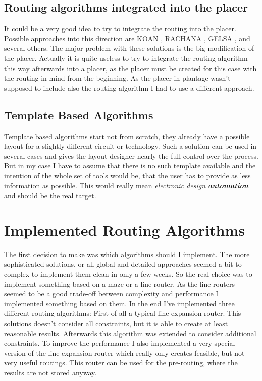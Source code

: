 \subsection{Routing algorithms integrated into the placer}
It could be a very good idea to try to integrate the routing into the placer. Possible approaches into this direction are KOAN \cite[page 178]{springer:eda_analog_routing}, RACHANA \cite[page 178]{springer:eda_analog_routing}, GELSA \cite[page 179]{springer:eda_analog_routing}, and several others. The major problem with these solutions is the big modification of the placer. Actually it is quite useless to try to integrate the routing algorithm this way afterwards into a placer, as the placer must be created for this case with the routing in mind from the beginning. As the placer in plantage wasn't supposed to include also the routing algorithm I had to use a different approach.

\subsection{Template Based Algorithms}
Template based algorithms start not from scratch, they already have a possible layout for a slightly different circuit or technology. Such a solution can be used in several cases and gives the layout designer nearly the full control over the process. But in my case I have to assume that there is no such template available and the intention of the whole set of tools would be, that the user has to provide as less information as possible. This would really mean \textit{electronic design \textbf{automation}} and should be the real target.

\section{Implemented Routing Algorithms}
The first decision to make was which algorithms should I implement. The more sophisticated solutions, or all global and detailed approaches seemed a bit to complex to implement them clean in only a few weeks. So the real choice was to implement something based on a maze or a line router. As the line routers seemed to be a good trade-off between complexity and performance I implemented something based on them. In the end I've implemented three different routing algorithms: First of all a typical line expansion router. This solutions doesn't consider all constraints, but it is able to create at least reasonable results. Afterwards this algorithm was extended to consider additional constraints. To improve the performance I also implemented a very special version of the line expansion router which really only creates feasible, but not very useful routings. This router can be used for the pre-routing, where the results are not stored anyway.

